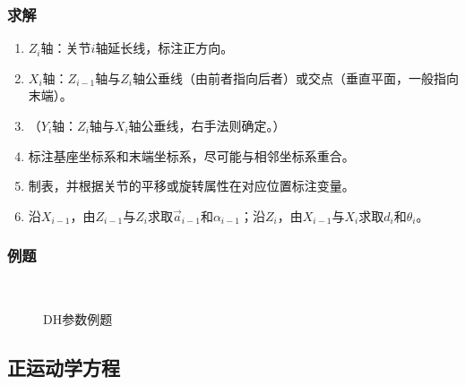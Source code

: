 \documentclass[
12pt, %
a4paper, 
oneside, %
headinclude,footinclude, %
]{scrartcl}
\begin{document}
\subsubsection[求解]{求解}
\begin{enumerate}
\item $ Z_i $轴：关节$ i $轴延长线，标注正方向。
\item $ X_i $轴：$ Z_{i - 1} $轴与$ Z_i $轴公垂线（由前者指向后者）或交点（垂直平面，一般指向末端）。
\item （$ Y_i $轴：$ Z_i $轴与$ X_i $轴公垂线，右手法则确定。）
\item 标注基座坐标系和末端坐标系，尽可能与相邻坐标系重合。
\item 制表，并根据关节的平移或旋转属性在对应位置标注变量。
\item 沿$ X_{i - 1} $，由$ Z_{i - 1} $与$ Z_i $求取$ \vec{a}_{i - 1}  $和$ \alpha_{i - 1} $；沿$ Z_i $，由$ X_{i - 1} $与$ X_i $求取$ d_i $和$ \theta_i $。
\end{enumerate}
\subsubsection[例题]{例题}
\begin{figure}[H]
\centering
\subfloat[例1结构图]{\texttt{[image: 1.1.1]}} \quad
\subfloat[例2结构图]{\texttt{[image: 1.2.1]}} \quad
\subfloat[例3结构图]{\texttt{[image: 1.3.1]}} \quad
\subfloat[例4结构图]{\texttt{[image: 1.4.1]}} \\
\subfloat[例1参数表]{\texttt{[image: 1.1.2]}} \quad
\subfloat[例2参数表]{\texttt{[image: 1.2.2]}} \quad
\subfloat[例3参数表]{\texttt{[image: 1.3.2]}} \quad
\subfloat[例4参数表]{\texttt{[image: 1.4.2]}}
\caption{DH参数例题}
\end{figure}
\subsection[正运动学方程]{正运动学方程}
\end{document}
